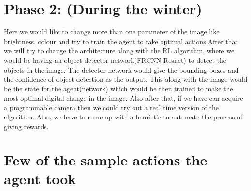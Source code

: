 \documentclass{article}
\begin{document}
\section{Phase 2: (During the winter)}
Here we would like to change more than one parameter of the image like brightness, colour and try to train the agent to take optimal actions.After that we will try to change the architecture along with the RL algorithm, where we would be having an object detector network(FRCNN-Resnet) to detect the objects in the image. The detector network would give the bounding boxes and the confidence of object detection as the output. This along with the image would be the state for the agent(network) which would be then trained to make the most optimal digital change in the image. Also after that, if we have can acquire a programmable camera then we could try out a real time version of the algorithm. Also, we have to come up with a heuristic to automate the process of giving rewards.

\section{Few of the sample actions the agent took}
\begin{figure}[H]
\hspace{0.05\textwidth}
\end{figure}
\end{document}
